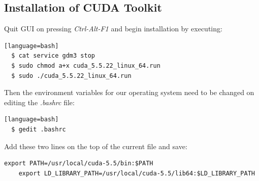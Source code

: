 \subsection{Installation of CUDA Toolkit}
Quit GUI on pressing \textit{Ctrl-Alt-F1} and begin installation by executing:
\begin{lstlisting}[style=DOS][language=bash]
  $ cat service gdm3 stop
  $ sudo chmod a+x cuda_5.5.22_linux_64.run
  $ sudo ./cuda_5.5.22_linux_64.run
\end{lstlisting}
Then the environment variables for our operating system need to be changed on editing the \textit{.bashrc} file:
\begin{lstlisting}[style=DOS][language=bash]
  $ gedit .bashrc
\end{lstlisting}
Add these two lines on the top of the current file and save:
\begin{lstlisting}[style=C]
    export PATH=/usr/local/cuda-5.5/bin:$PATH
    export LD_LIBRARY_PATH=/usr/local/cuda-5.5/lib64:$LD_LIBRARY_PATH
\end{lstlisting}



